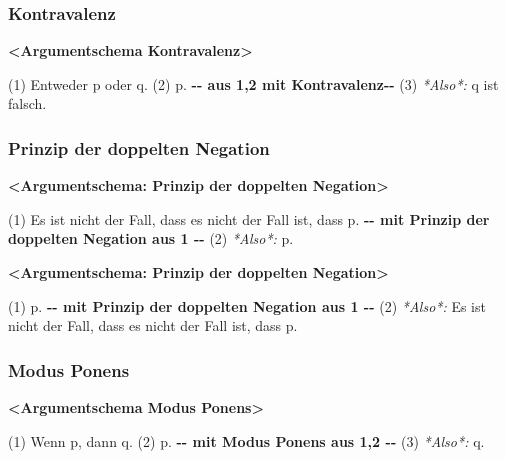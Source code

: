 \documentclass[
  english,
  a4paper,
]{article}
\newenvironment{Shaded}{\begin{snugshade}}{\end{snugshade}}
\newcommand{\AlertTok}[1]{\textcolor[rgb]{0.02,0.51,0.79}{\textbf{#1}}}
\newcommand{\ErrorTok}[1]{\textcolor[rgb]{0.02,0.51,0.79}{#1}}
\newcommand{\FloatTok}[1]{\textcolor[rgb]{0.12,0.11,0.11}{\textit{#1}}}
\newcommand{\NormalTok}[1]{\textcolor[rgb]{0.12,0.11,0.11}{#1}}
\newcommand{\WarningTok}[1]{\textcolor[rgb]{0.46,0.73,0.89}{\textbf{#1}}}
\renewenvironment{Shaded}{\centering \begin{mdframed}[style=codedefault]}{\end{mdframed}}%
\newenvironment{Shaded}{\centering \begin{mdframed}[style=codedefault]}{\end{mdframed}}%
\begin{document}
\subsubsection{Kontravalenz}\label{kontravalenz}

\begin{Shaded}
\begin{Highlighting}[]
\AlertTok{\textless{}Argumentschema Kontravalenz\textgreater{}}

\ErrorTok{(1)}\NormalTok{ Entweder p oder q.}
\ErrorTok{(2)}\NormalTok{ p.}
\WarningTok{{-}{-} aus 1,2 mit Kontravalenz{-}{-}}
\ErrorTok{(3)}\FloatTok{ *Also*:}\NormalTok{ q ist falsch.}
\end{Highlighting}
\end{Shaded}

\subsubsection{Prinzip der doppelten
Negation}\label{prinzip-der-doppelten-negation}

\begin{Shaded}
\begin{Highlighting}[]
\AlertTok{\textless{}Argumentschema: Prinzip der doppelten Negation\textgreater{}}

\ErrorTok{(1)}\NormalTok{ Es ist nicht der Fall, dass es nicht der Fall ist, dass p.}
\WarningTok{{-}{-} mit Prinzip der doppelten Negation aus 1 {-}{-}}
\ErrorTok{(2)}\FloatTok{ *Also*:}\NormalTok{ p.}
\end{Highlighting}
\end{Shaded}

\begin{Shaded}
\begin{Highlighting}[]
\AlertTok{\textless{}Argumentschema: Prinzip der doppelten Negation\textgreater{}}

\ErrorTok{(1)}\NormalTok{ p.}
\WarningTok{{-}{-} mit Prinzip der doppelten Negation aus 1 {-}{-}}
\ErrorTok{(2)}\FloatTok{ *Also*:}\NormalTok{ Es ist nicht der Fall, dass es nicht der Fall ist, dass p.}
\end{Highlighting}
\end{Shaded}

\subsubsection{Modus Ponens}\label{modus-ponens}

\begin{Shaded}
\begin{Highlighting}[]
\AlertTok{\textless{}Argumentschema Modus Ponens\textgreater{}}

\ErrorTok{(1)}\NormalTok{ Wenn p, dann q.}
\ErrorTok{(2)}\NormalTok{ p.}
\WarningTok{{-}{-} mit Modus Ponens aus 1,2 {-}{-}}
\ErrorTok{(3)}\FloatTok{ *Also*:}\NormalTok{ q.}
\end{Highlighting}
\end{Shaded}
\end{document}
